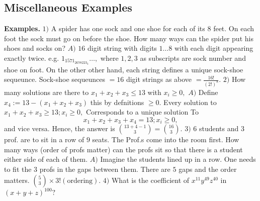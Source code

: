\documentclass{article}
\begin{document}
\subsection{Miscellaneous Examples}
\textbf{Examples. }
\newline
$1) $ A spider has one sock and one shoe for each of its $8$ feet. On each foot the sock 
must go on before the shoe. How many ways can the spider put his shoes and socks on?
\newline
\newline
$A) $ $16 $ digit string with digits $1 \dots 8$ with each digit appearing exactly twice. 
\newline
\newline
e.g. $1_1571_2678223_3\dots,$ where $1, 2, 3$ as subscripts are sock number and shoe on foot.
\newline
\newline
On the other other hand, each string defines a unique sock-shoe sequeunce.
\newline
\newline
Sock-shoe sequeunces $= 16$ digit strings as above $= \frac{16!}{(2!)^8}.$
\newline
\newline
$2) $ How many solutions are there to $x_1 + x_2 + x_3 \leq 13$ with $x_i \geq 0,$
\newline
\newline
$A) $ Define $x_4 := 13 - (x_1 + x_2 + x_3)$ this by defnitions $\geq 0.$
\newline
Every solution to $x_1 + x_2 + x_3 \geq 13; x_i \geq 0,$
\newline
Corresponds to a unique solution To
$$x_1 + x_2 + x_3 + x_4 = 13; x_i \geq 0,$$
and vice versa. Hence, the answer is $\binom{13 + 4 - 1}{3} = \binom{16}{3}.$
\newline
\newline
$3) $ $6$ students and $3$ prof. are to sit in a row of $9$ seats. The Prof.s 
come into the room first. How many ways (order of profs matter) can the profs 
sit so that there is a student either side of each of them. 
\newline
\newline
$A) $ Imagine the students lined up in a row. One needs to fit the $3$ profs in the gaps between them.
There are $5$ gaps and the order matters. $\binom{5}{3} \times 3! (\text{ordering})$.
\newline
\newline
$4) $ What is the coefficient of $x^11y^49z^40$ in $(x + y + z)^100 ?$
\end{document}
